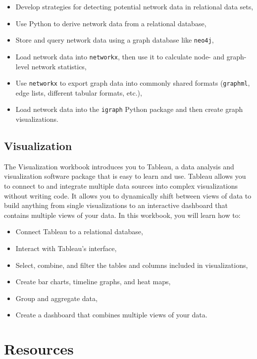 \documentclass[]{krantz}
\begin{document}
\begin{itemize}
\item
  Develop strategies for detecting potential network data in relational
  data sets,
\item
  Use Python to derive network data from a relational database,
\item
  Store and query network data using a graph database like
  \texttt{neo4j},
\item
  Load network data into \texttt{networkx}, then use it to calculate
  node- and graph-level network statistics,
\item
  Use \texttt{networkx} to export graph data into commonly shared
  formats (\texttt{graphml}, edge lists, different tabular formats,
  etc.),
\item
  Load network data into the \texttt{igraph} Python package and then
  create graph visualizations.
\end{itemize}

\subsection{Visualization}\label{visualization}

The Visualization workbook introduces you to Tableau, a data analysis
and visualization software package that is easy to learn and use.
Tableau allows you to connect to and integrate multiple data sources
into complex visualizations without writing code. It allows you to
dynamically shift between views of data to build anything from single
visualizations to an interactive dashboard that contains multiple views
of your data. In this workbook, you will learn how to:

\begin{itemize}
\item
  Connect Tableau to a relational database,
\item
  Interact with Tableau's interface,
\item
  Select, combine, and filter the tables and columns included in
  visualizations,
\item
  Create bar charts, timeline graphs, and heat maps,
\item
  Group and aggregate data,
\item
  Create a dashboard that combines multiple views of your data.
\end{itemize}

\section{Resources}\label{resources-7}
\end{document}
